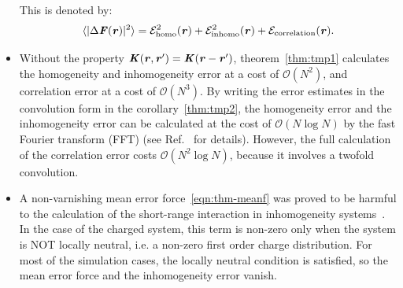 \documentclass[aps,pre,preprint,unsortedaddress]{revtex4}
\renewcommand{\v}[1]{\textbf{\textit{#1}}}
\begin{document}
\begin{itemize}
  This is denoted by:
  \begin{align}\label{eqn:error-split}
    \langle\vert\Delta\v F(\v r)\vert^2\rangle
    =
    \mathcal E^2_{\textrm{homo}}(\v r) +
    \mathcal E^2_{\textrm{inhomo}}(\v r) +
    \mathcal E_{\textrm{correlation}}(\v r).
  \end{align}
\item
  Without the property $\v K(\v r,\v r') = \v K(\v r - \v r')$,
  theorem~\ref{thm:tmp1} calculates the homogeneity and inhomogeneity
  error at a cost of $\mathcal O(N^2)$, and correlation error
  at a cost of $\mathcal O(N^3)$.
  By writing the error estimates in the convolution form in
  the corollary~\ref{thm:tmp2},
  the homogeneity error and the inhomogeneity
  error can be calculated at the cost of $\mathcal O(N\log N)$ by the
  fast Fourier transform (FFT) (see Ref.~\cite{wang2012} for details).
  However, the full calculation of the correlation error costs $\mathcal
  O(N^2\log N)$, because it involves a twofold convolution.
\item A non-varnishing mean error force~\eqref{eqn:thm-meanf} was proved
  to be
  harmful to the calculation of the short-range interaction
  in inhomogeneity systems~\cite{wang2012}.
  In the case of the charged system, this
  term is non-zero only when the system is NOT locally neutral,
  i.e. a non-zero first order charge distribution. For
  most of the simulation cases, the locally neutral condition is
  satisfied, so the mean error force and the inhomogeneity error
  vanish.
\end{itemize}
\end{document}
